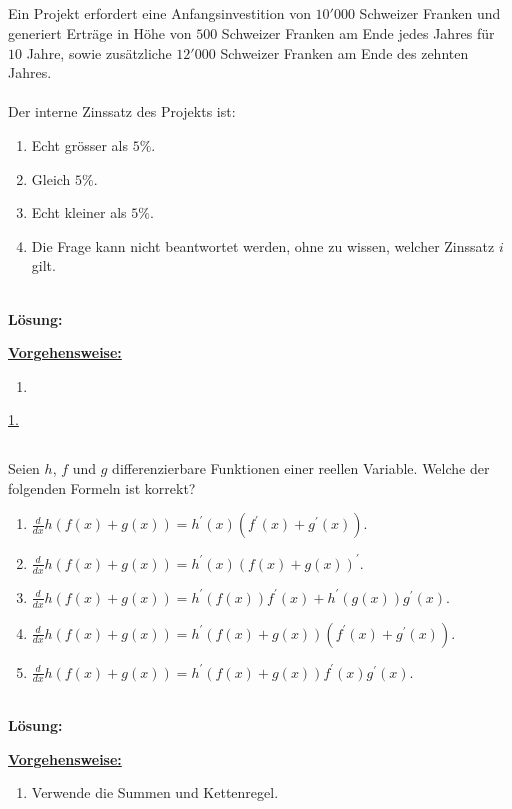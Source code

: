 \subsection*{}
Ein Projekt erfordert eine Anfangsinvestition von $10'000$ Schweizer Franken und generiert Erträge in Höhe von $500$ Schweizer Franken am Ende jedes Jahres für $10$ Jahre, sowie zusätzliche $12'000$ Schweizer Franken am Ende des zehnten Jahres.\\
\\
Der interne Zinssatz des Projekts ist:
\renewcommand{\labelenumi}{(\alph{enumi})}
\begin{enumerate}
	\item 
	Echt grösser als $5 \%$.
	\item 
	Gleich $5 \%$.
	\item
	Echt kleiner als $5 \%$.
	\item
	Die Frage kann nicht beantwortet werden, ohne zu wissen, welcher Zinssatz $i$ gilt.
\end{enumerate}
\ \\
\textbf{Lösung:}
\begin{mdframed}
\underline{\textbf{Vorgehensweise:}}
\renewcommand{\labelenumi}{\theenumi.}
\begin{enumerate}
\item 
\end{enumerate}
\end{mdframed}

\underline{1. }\\



 \newpage

\subsection*{}
Seien $h$, $f$ und $g$ differenzierbare Funktionen einer reellen Variable. Welche der folgenden Formeln ist korrekt?
\renewcommand{\labelenumi}{(\alph{enumi})}
\begin{enumerate}
	\item 
	$ \frac{d}{dx}h(f(x) + g(x)) = h^\prime(x) ( f^\prime(x) + g^\prime(x))$.
	\item 
	$ \frac{d}{dx}h(f(x) + g(x)) = h^\prime(x) ( f(x) + g(x))^\prime$.
	\item
	$ \frac{d}{dx}h(f(x) + g(x)) = h^\prime(f(x))  f^\prime(x) + h^\prime(g(x)) g^\prime(x)$.
	\item
	$ \frac{d}{dx}h(f(x) + g(x)) = h^\prime(f(x) + g(x))  (f^\prime(x) +  g^\prime(x) )$.
	\item
	$ \frac{d}{dx}h(f(x) + g(x)) = h^\prime(f(x) + g(x))  f^\prime(x)  g^\prime(x)$.
\end{enumerate}
\ \\
\textbf{Lösung:}
\begin{mdframed}
\underline{\textbf{Vorgehensweise:}}
\renewcommand{\labelenumi}{\theenumi.}
\begin{enumerate}
\item Verwende die Summen und Kettenregel.
\end{enumerate}
\end{mdframed}


